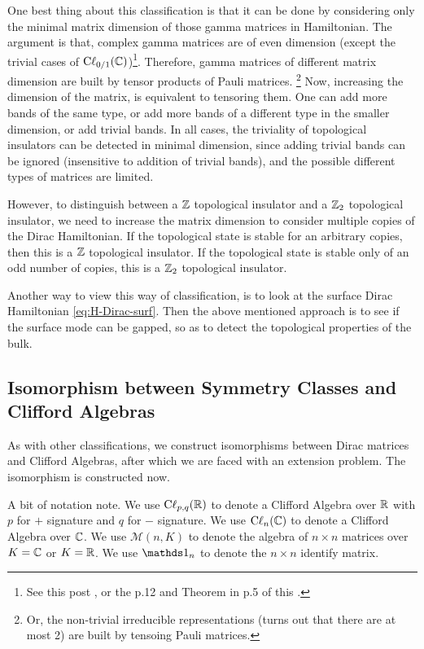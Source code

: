 One best thing about this classification is that it can be done by considering
only the minimal matrix dimension of those gamma matrices in Hamiltonian. The
argument is that, complex gamma matrices are of even dimension (except the
trivial cases of $\mathrm{C\ell}_{0/1}(\mathbb{C})$)\footnote{See this post
\cite{PhysicsStackExchange}, or the p.12 and Theorem in p.5 of this
\cite{West1998}.}. Therefore, gamma matrices of different
matrix dimension are built by tensor products of Pauli matrices.
\footnote{Or, the non-trivial irreducible representations (turns out that there are
at most 2) are built by tensoing Pauli matrices.}
Now, increasing the dimension of the matrix, is equivalent to
tensoring them. One can add more bands of the same type, or add more bands of a
different type in the smaller dimension, or add trivial bands. In all cases, the
triviality of topological insulators can be detected in minimal dimension, since
adding trivial bands can be ignored (insensitive to addition of trivial bands),
and the possible different types of matrices are limited.

However, to distinguish between a $\mathbb{Z}$ topological insulator and a $\mathbb{Z}_2$
topological insulator, we need to increase the matrix dimension to consider
multiple copies of the Dirac Hamiltonian. If the topological state is stable for
an arbitrary copies, then this is a $\mathbb{Z}$ topological insulator. If the
topological state is stable only of an odd number of copies, this is a $\mathbb{Z}_2$
topological insulator.

Another way to view this way of classification, is to look at the surface
Dirac Hamiltonian \ref{eq:H-Dirac-surf}. Then the above mentioned approach is to
see if the surface mode can be gapped, so as to detect the topological
properties of the bulk.

\subsection{Isomorphism between Symmetry Classes and Clifford Algebras}
\label{sec:Isomorphism}
As with other classifications, we construct isomorphisms between Dirac matrices
and Clifford Algebras, after which we are faced with an extension problem. The
isomorphism is constructed now. 

A bit of notation note. We use $\mathrm{C\ell}_{p,q}(\mathbb{R})$ to denote a Clifford
Algebra over $\mathbb{R}$ with $p$ for $+$ signature and $q$ for $-$ signature. We use
$\mathrm{C\ell}_{n}(\mathbb{C})$ to denote a Clifford Algebra over $\mathbb{C}$. We use
$\mathcal{M}(n,K)$ to denote the algebra of $n\times n$ matrices over $K=\mathbb{C}$ or
$K=\mathbb{R}$. We use $\id_n$ to denote the $n\times n$ identify matrix.

